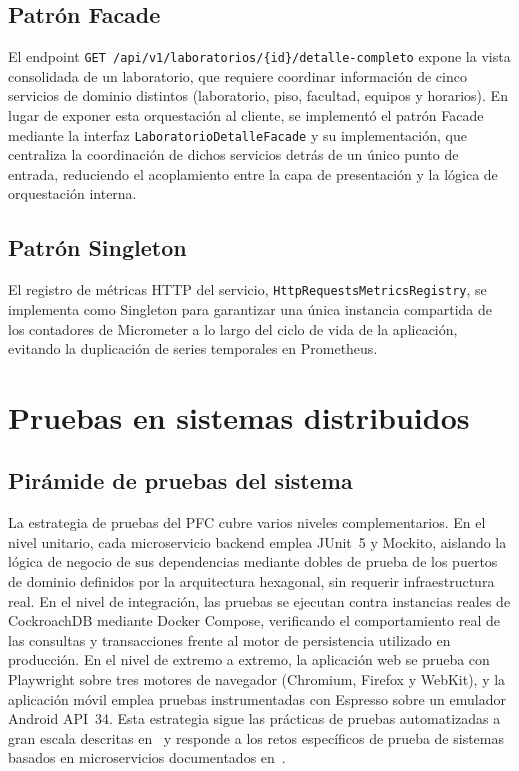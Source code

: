\documentclass[11pt,a4paper]{article}
\begin{document}
\subsection{Patrón Facade}

El endpoint \texttt{GET /api/v1/laboratorios/\{id\}/detalle-completo}
expone la vista consolidada de un laboratorio, que requiere coordinar
información de cinco servicios de dominio distintos (laboratorio, piso,
facultad, equipos y horarios). En lugar de exponer esta orquestación al
cliente, se implementó el patrón Facade mediante la interfaz
\texttt{LaboratorioDetalleFacade} y su implementación, que centraliza la
coordinación de dichos servicios detrás de un único punto de entrada,
reduciendo el acoplamiento entre la capa de presentación y la lógica de
orquestación interna.

\subsection{Patrón Singleton}

El registro de métricas HTTP del servicio, \texttt{HttpRequestsMetricsRegistry},
se implementa como Singleton para garantizar una única instancia
compartida de los contadores de Micrometer a lo largo del ciclo de vida
de la aplicación, evitando la duplicación de series temporales en
Prometheus.

\section{Pruebas en sistemas distribuidos}
\label{sec:pruebas}

\subsection{Pirámide de pruebas del sistema}

La estrategia de pruebas del PFC cubre varios niveles complementarios.
En el nivel unitario, cada microservicio backend emplea JUnit~5 y
Mockito, aislando la lógica de negocio de sus dependencias mediante
dobles de prueba de los puertos de dominio definidos por la arquitectura
hexagonal, sin requerir infraestructura real. En el nivel de integración,
las pruebas se ejecutan contra instancias reales de CockroachDB
mediante Docker Compose, verificando el comportamiento real de las
consultas y transacciones frente al motor de persistencia utilizado en
producción. En el nivel de extremo a extremo, la aplicación web se
prueba con Playwright sobre tres motores de navegador (Chromium,
Firefox y WebKit), y la aplicación móvil emplea pruebas instrumentadas
con Espresso sobre un emulador Android API~34. Esta estrategia sigue
las prácticas de pruebas automatizadas a gran escala descritas
en~\cite{winters2020software} y responde a los retos específicos de
prueba de sistemas basados en microservicios documentados
en~\cite{testgen2025microservices}.
\end{document}

